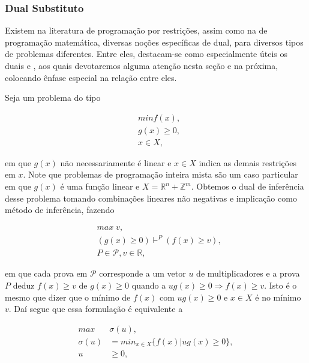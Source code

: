 \documentclass{article}
\begin{document}
\subsubsection{Dual Substituto}

Existem na literatura de programação por restrições, assim como na de programação matemática,
diversas noções específicas de dual, para diversos tipos de problemas diferentes. Entre eles, destacam-se
como especialmente úteis os duais  e , aos quais devotaremos alguma atenção
nesta seção e na próxima, colocando ênfase especial na relação entre eles.

Seja um problema do tipo

\begin{equation}
  \begin{split}
    & min f(x),\\
    & g(x) \geq 0,\\
    & x \in X,
  \end{split}\label{eqt:geral}
\end{equation}

\noindent em que $g(x)$ não necessariamente é linear e  $x \in X$ indica as demais restrições em $x$. Note
que problemas de programação inteira mista são um caso particular em que $g(x)$ é uma função linear e $X =
\mathbb{R}^n + \mathbb{Z}^m$. Obtemos o dual de inferência desse problema tomando combinações
lineares não negativas e implicação como método de inferência, fazendo

\begin{equation}
  \begin{split}
    & max \; v,\\
    & (g(x) \geq 0) \vdash^P (f(x) \geq v),\\
    & P \in \mathcal{P}, v \in \mathbb{R},
  \end{split}\label{eqt:surro}
\end{equation}

\noindent em que cada prova em $\mathcal{P}$ corresponde a um vetor $u$ de multiplicadores e a prova
$P$ deduz $f(x) \geq v$ de $g(x) \geq 0$ quando a $ug(x) \geq 0 \Rightarrow f(x) \geq
v$. Isto é o mesmo que dizer que o mínimo de $f(x)$ com $ug(x) \geq 0$ e $x \in X$ é no mínimo $v$.
Daí segue que essa formulação é equivalente a

\begin{align*}
  max \;& \sigma(u),\\
  \sigma(u) &= min_{x\in X}\{f(x)|ug(x)\geq0\},\\
  u &\geq 0,
\end{align*}
\end{document}
